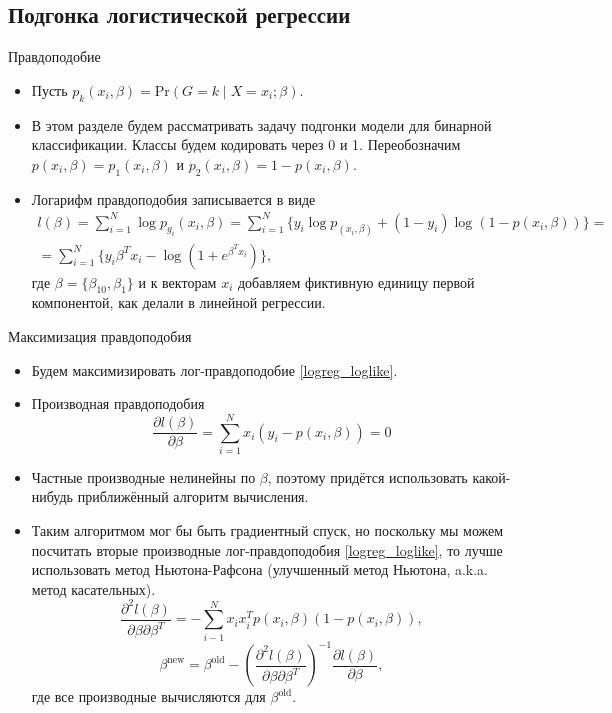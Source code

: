 \documentclass[9pt]{beamer}
\begin{document}
\subsection{Подгонка логистической регрессии}

\begin{frame}{Правдоподобие}
    \begin{itemize}
        \item Пусть $p_k(x_i, \beta) = \text{Pr}(G=k\;|\; X=x_i; \beta)$.
        \item В этом разделе будем рассматривать задачу подгонки модели для бинарной классификации. Классы будем кодировать через 0 и 1. Переобозначим $p(x_i, \beta) = p_1(x_i, \beta)$ и $p_2(x_i, \beta) = 1 - p(x_i, \beta)$.
        \item Логарифм правдоподобия записывается в виде
        \begin{equation}\label{logreg_loglike}
            \begin{split}
            l(\beta) = \sum_{i=1}^N \log p_{g_i} (x_i, \beta) = \sum_{i=1}^N \Big\{ y_i\log p_(x_i, \beta) + (1-y_i)\log(1-p(x_i, \beta))\Big\}=\\
            = \sum_{i=1}^N \Big\{ y_i\beta^T x_i - \log (1+e^{\beta^T x_i}) \Big\},
            \end{split}
        \end{equation}
        где $\beta = \{\beta_{10},\beta_1\}$ и к векторам $x_i$ добавляем фиктивную единицу первой компонентой, как делали в линейной регрессии.
    \end{itemize}
\end{frame}

\begin{frame}{Максимизация правдоподобия}
\begin{itemize}
    \item Будем максимизировать лог-правдоподобие \ref{logreg_loglike}.
    \item Производная правдоподобия
    $$\frac{\partial l(\beta)}{\partial\beta} = \sum_{i=1}^N x_i(y_i - p(x_i, \beta)) = 0$$
    \item Частные производные нелинейны по $\beta$, поэтому придётся использовать какой-нибудь приближённый алгоритм вычисления.
    \item Таким алгоритмом мог бы быть градиентный спуск, но поскольку мы можем посчитать вторые производные лог-правдоподобия \ref{logreg_loglike}, то лучше использовать метод Ньютона-Рафсона (улучшенный метод Ньютона, a.k.a. метод касательных).
    $$\frac{\partial^2 l(\beta)}{\partial \beta \partial \beta^T} = -\sum_{i-1}^N x_ix_i^T p(x_i, \beta)(1-p(x_i,\beta)),$$
    $$\beta^{\text{new}} = \beta^{\text{old}} - \left(\frac{\partial^2 l(\beta)}{\partial \beta \partial \beta^T}\right)^{-1} \frac{\partial l(\beta)}{\partial\beta},$$
    где все производные вычисляются для $\beta^{\text{old}}$.
\end{itemize}
\end{frame}
\end{document}
